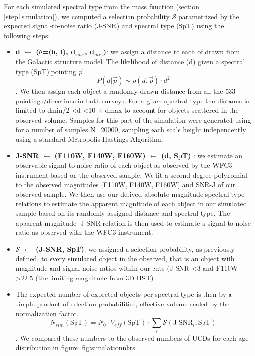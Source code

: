 \documentclass[manuscript]{aastex63}
\begin{document}
For each simulated spectral type from the mass function (section \ref{step1simulation}), we computed a selection probability $\mathcal{S}$ parametrized by the expected signal-to-noise ratio (J-SNR) and spectral type (SpT) using the following steps:
\begin{itemize}
\item \textbf{ d $\leftarrow$ ($\theta$=(h, l), d$_{max}$, d$_{min}$)}: we assign a distance to each of drawn from the Galactic structure model. The likelihood of distance (d) given a spectral type  (SpT) pointing $\vec{p}$ \begin{equation}  P(d|\vec{p}) \sim \rho (d, \vec{p}) \cdot d^2 \end{equation}. We then assign each object a randomly drawn distance from all the 533 pointings/directions in both surveys. For a given spectral type the distance is limited to dmin/2 \textless d \textless 10 $\times$ dmax to account for objects scattered in the observed volume. Samples for this part of the simulation were generated using  for a number of samples N=20000, sampling each scale height independently using a standard Metropolis-Hastings Algorithm.

\item \textbf{J-SNR  $\leftarrow$  (F110W, F140W, F160W) $\leftarrow$ (d, SpT) }: we estimate an observable signal-to-noise ratio of each object as observed by the WFC3 instrument based on the observed sample. We fit a second-degree polynomial to the observed magnitudes (F110W, F140W, F160W)  and SNR-J of our observed sample. We then use our derived absolute-magnitude spectral type relations to estimate the apparent magnitude of each object in our simulated sample based on its randomly-assigned distance and spectral type. The apparent magnitude- J-SNR relation is then used to estimate a signal-to-noise ratio as observed with the WFC3 instrument. 

\item \textbf{ $\mathcal{S}$  $\leftarrow$ (J-SNR, SpT)}: we assigned a selection probability, as previously defined, to every simulated object in the observed, that is an object with magnitude and signal-noise ratios within our cuts (J-SNR \textless 3 and F110W \textgreater 22.5 (the limiting magnitude from 3D-HST). 

\item The expected number of expected objects per spectral type is then by a simple product of selection probabilities, effective volume scaled by the normalization factor. 
\begin{equation}
N_{sim}(\text{SpT})= N_0 \cdot V_{eff} (\text{SpT}) \cdot \sum _i \mathcal{S}(\text{J-SNR}_i, \text{SpT}) \end{equation}. We compared these numbers to the observed numbers of UCDs for each age distribution in figure \ref{fig:simulationnbrs}

\end{itemize}
\end{document}
